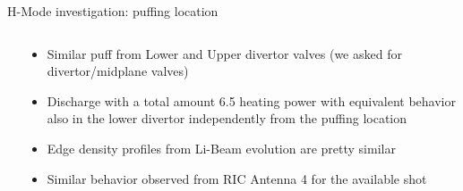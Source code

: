 \documentclass[10pt, compress]{beamer}
\newcommand\Fontvi{\fontsize{8}{7.2}\selectfont}
\begin{document}
\begin{frame}{H-Mode investigation: puffing location}
\Fontvi
  \vspace{-1cm}
\begin{columns}
  \begin{column}{0.65\textwidth}
  \end{column}
  \begin{column}{0.35\textwidth}
    \begin{itemize}
      \item<1-> Similar puff from Lower and Upper divertor valves
        (\alert{we asked for divertor/midplane valves})
      \item<2-> Discharge with a total amount 6.5 heating power
        with equivalent behavior also in the lower divertor
        independently from the puffing location
      \item<3-> Edge density profiles from Li-Beam evolution are
        pretty similar
      \item<3|alert@3> Similar behavior observed from RIC Antenna 4
        for the available shot
    \end{itemize}
  \end{column}
\end{columns}
\end{frame}
\end{document}
